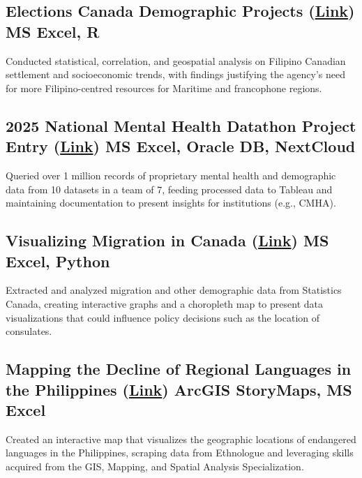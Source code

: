 \subsection{{Elections Canada Demographic Projects (\href{https://github.com/Francis-Calingo/Elections-Canada-Demographic-Projects}{Link}) \hfill MS Excel, R}}
Conducted statistical, correlation, and geospatial analysis on Filipino Canadian settlement and socioeconomic trends,
with findings justifying the agency’s need for more Filipino-centred resources for Maritime and francophone regions.
\vspace{5pt}
\subsection{{2025 National Mental Health Datathon Project Entry (\href{https://github.com/Francis-Calingo/Proprietary-Data-Projects/?tab=readme-ov-file#2025-national-mental-health-datathon}{Link}) \hfill  MS Excel, Oracle DB, NextCloud}}
Queried over 1 million records of proprietary mental health and demographic data from 10 datasets in a team of 7,
feeding processed data to Tableau and maintaining documentation to present insights for institutions (e.g., CMHA).
\vspace{5pt}
\subsection{{Visualizing Migration in Canada (\href{https://github.com/Francis-Calingo/Elections-Canada-Demographic-Projects}{Link}) \hfill MS Excel, Python}}
Extracted and analyzed migration and other demographic data from Statistics Canada, creating interactive graphs and a choropleth map to present data visualizations that could influence policy decisions such as the location of consulates.
\vspace{5pt}
\subsection{{Mapping the Decline of Regional Languages in the Philippines (\href{https://storymaps.arcgis.com/stories/44ef21a201d04242942a9573d5d62919}{Link}) \hfill  ArcGIS StoryMaps, MS Excel}}
Created an interactive map that visualizes the geographic locations of endangered languages in the Philippines, scraping data from Ethnologue and leveraging skills acquired from the GIS, Mapping, and Spatial Analysis Specialization.
\vspace{5pt}
